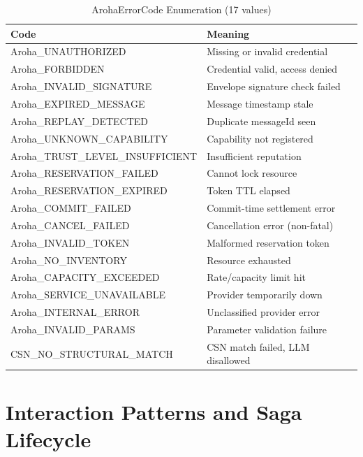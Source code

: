 \documentclass[conference]{IEEEtran}
\begin{document}
\begin{table}[t]
\centering
\caption{ArohaErrorCode Enumeration (17 values)}
\label{tab:errorcodes}
{\small
\begin{tabular}{@{}ll@{}}
\toprule
\textbf{Code} & \textbf{Meaning} \\
\midrule
Aroha\_UNAUTHORIZED         & Missing or invalid credential \\
Aroha\_FORBIDDEN            & Credential valid, access denied \\
Aroha\_INVALID\_SIGNATURE   & Envelope signature check failed \\
Aroha\_EXPIRED\_MESSAGE     & Message timestamp stale \\
Aroha\_REPLAY\_DETECTED     & Duplicate messageId seen \\
Aroha\_UNKNOWN\_CAPABILITY  & Capability not registered \\
Aroha\_TRUST\_LEVEL\_INSUFFICIENT & Insufficient reputation \\
Aroha\_RESERVATION\_FAILED  & Cannot lock resource \\
Aroha\_RESERVATION\_EXPIRED & Token TTL elapsed \\
Aroha\_COMMIT\_FAILED       & Commit-time settlement error \\
Aroha\_CANCEL\_FAILED       & Cancellation error (non-fatal) \\
Aroha\_INVALID\_TOKEN       & Malformed reservation token \\
Aroha\_NO\_INVENTORY        & Resource exhausted \\
Aroha\_CAPACITY\_EXCEEDED   & Rate/capacity limit hit \\
Aroha\_SERVICE\_UNAVAILABLE & Provider temporarily down \\
Aroha\_INTERNAL\_ERROR      & Unclassified provider error \\
Aroha\_INVALID\_PARAMS      & Parameter validation failure \\
CSN\_NO\_STRUCTURAL\_MATCH  & CSN match failed, LLM disallowed \\
\bottomrule
\end{tabular}
}
\end{table}

\section{Interaction Patterns and Saga Lifecycle}
\label{sec:patterns}
\end{document}
